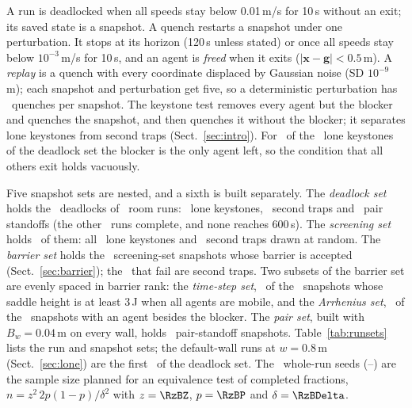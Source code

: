 A run is deadlocked when all speeds stay below 0.01\,m/s for 10\,s without an exit; its saved state is a snapshot. A quench restarts a snapshot under one perturbation. It stops at its horizon (120\,s unless stated) or once all speeds stay below $10^{-3}$\,m/s for 10\,s, and an agent is \emph{freed} when it exits ($|\mathbf x-\mathbf g|<0.5$\,m). A \emph{replay} is a quench with every coordinate displaced by Gaussian noise (SD $10^{-9}$\,m); each snapshot and perturbation get five, so a deterministic perturbation has \RvAeightRunsPerSnap\ quenches per snapshot. The keystone test removes every agent but the blocker and quenches the snapshot, and then quenches it without the blocker; it separates lone keystones from second traps (Sect.~\ref{sec:intro}). For \RzDLoneOnly\ of the \RzDLoneN\ lone keystones of the deadlock set the blocker is the only agent left, so the condition that all others exit holds vacuously.

Five snapshot sets are nested, and a sixth is built separately. The \emph{deadlock set} holds the \FinCritN\ deadlocks of \RevAfiveRuns\ room runs: \KeystoneBLone\ lone keystones, \KeystoneBSecondTrap\ second traps and \FinCritNegN\ pair standoffs (the other \RvAeightComplete\ runs complete, and none reaches 600\,s). The \emph{screening set} holds \EtwoNAll\ of them: all \EtwoNLK\ lone keystones and \EtwoNST\ second traps drawn at random. The \emph{barrier set} holds the \LoneBarN\ screening-set snapshots whose barrier is accepted (Sect.~\ref{sec:barrier}); the \RevAfiveGateFailSecond\ that fail are second traps. Two subsets of the barrier set are evenly spaced in barrier rank: the \emph{time-step set}, \EthreeN\ of the \RevAfiveEthreeQual\ snapshots whose saddle height is at least 3\,J when all agents are mobile, and the \emph{Arrhenius set}, \EfourN\ of the \FixAthreeEfourQual\ snapshots with an agent besides the blocker. The \emph{pair set}, built with $B_w=0.04$\,m on every wall, holds \PairN\ pair-standoff snapshots. Table~\ref{tab:runsets} lists the run and snapshot sets; the default-wall runs at $w=0.8$\,m (Sect.~\ref{sec:lone}) are the first \EsevenN\ of the deadlock set. The \RzSetWholeN\ whole-run seeds (\RzSetWholeLo--\RzSetWholeHi) are the sample size planned for an equivalence test of completed fractions, $n=z^2\,2p(1-p)/\delta^2$ with $z=\RzBZ$, $p=\RzBP$ and $\delta=\RzBDelta$.
